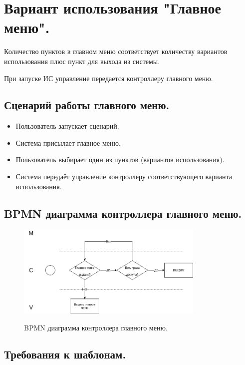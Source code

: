 \documentclass[12pt, a4paper]{article}
\begin{document}
   \section{Вариант использования "Главное меню".}
   
   Количество пунктов в главном меню соответствует количеству вариантов использования
   плюс пункт для выхода из системы.
   
   При запуске ИС управление передается контроллеру главного меню.
   
   \subsection{Сценарий работы главного меню.}
   \begin{itemize}
   	\item Пользователь запускает сценарий.
   	\item Система присылает главное меню.
   	\item Пользователь выбирает один из пунктов (вариантов использования).
   	\item Система передаёт управление контроллеру соответствующего варианта
   	использования.
   \end{itemize}
   \newpage

   \subsection{BPMN диаграмма контроллера главного меню.}
   \begin{figure}[ht!]
   	\centering    %
   	\includegraphics[width=0.8\textwidth]{pictures/BPMN_main_menu_using.png}
   	\label{fig:pic2} %
   	\caption{BPMN диаграмма контроллера главного меню.}
   \end{figure}

   \subsection{Требования к шаблонам.}
   
\end{document}
